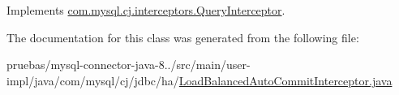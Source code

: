 Implements \mbox{\hyperlink{interfacecom_1_1mysql_1_1cj_1_1interceptors_1_1_query_interceptor_a1613f5491fdb4610d5727d60c904e7e2}{com.\+mysql.\+cj.\+interceptors.\+Query\+Interceptor}}.



The documentation for this class was generated from the following file\+:\begin{DoxyCompactItemize}
\item 
pruebas/mysql-\/connector-\/java-\/8../src/main/user-\/impl/java/com/mysql/cj/jdbc/ha/\mbox{\hyperlink{_load_balanced_auto_commit_interceptor_8java}{Load\+Balanced\+Auto\+Commit\+Interceptor.\+java}}\end{DoxyCompactItemize}
